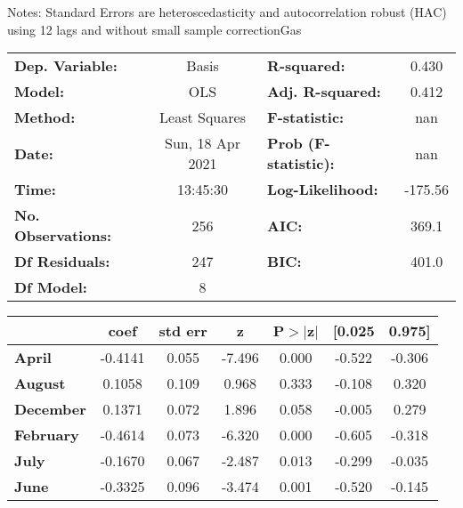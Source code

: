 Notes: \newline
 [1] Standard Errors are heteroscedasticity and autocorrelation robust (HAC) using 12 lags and without small sample correctionGas\begin{center}
\begin{tabular}{lclc}
\toprule
\textbf{Dep. Variable:}    &      Basis       & \textbf{  R-squared:         } &     0.430   \\
\textbf{Model:}            &       OLS        & \textbf{  Adj. R-squared:    } &     0.412   \\
\textbf{Method:}           &  Least Squares   & \textbf{  F-statistic:       } &       nan   \\
\textbf{Date:}             & Sun, 18 Apr 2021 & \textbf{  Prob (F-statistic):} &      nan    \\
\textbf{Time:}             &     13:45:30     & \textbf{  Log-Likelihood:    } &   -175.56   \\
\textbf{No. Observations:} &         256      & \textbf{  AIC:               } &     369.1   \\
\textbf{Df Residuals:}     &         247      & \textbf{  BIC:               } &     401.0   \\
\textbf{Df Model:}         &           8      & \textbf{                     } &             \\
\bottomrule
\end{tabular}
\begin{tabular}{lcccccc}
                  & \textbf{coef} & \textbf{std err} & \textbf{z} & \textbf{P$> |$z$|$} & \textbf{[0.025} & \textbf{0.975]}  \\
\midrule
\textbf{April}    &      -0.4141  &        0.055     &    -7.496  &         0.000        &       -0.522    &       -0.306     \\
\textbf{August}   &       0.1058  &        0.109     &     0.968  &         0.333        &       -0.108    &        0.320     \\
\textbf{December} &       0.1371  &        0.072     &     1.896  &         0.058        &       -0.005    &        0.279     \\
\textbf{February} &      -0.4614  &        0.073     &    -6.320  &         0.000        &       -0.605    &       -0.318     \\
\textbf{July}     &      -0.1670  &        0.067     &    -2.487  &         0.013        &       -0.299    &       -0.035     \\
\textbf{June}     &      -0.3325  &        0.096     &    -3.474  &         0.001        &       -0.520    &       -0.145     \\

\end{tabular}
\end{center}
